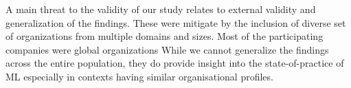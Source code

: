 



A main threat to the validity of our study relates to external validity and generalization of the findings. These were mitigate by the inclusion of diverse set of organizations from multiple domains and sizes. Most of the participating companies were global organizations %
While we cannot generalize the findings across the entire population, they do provide insight into the state-of-practice of ML especially in contexts having similar organisational profiles. 



